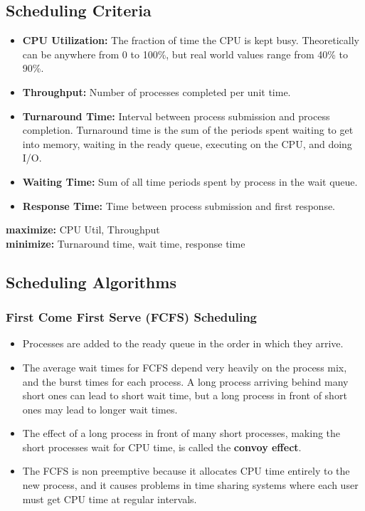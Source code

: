 \documentclass{article}
\theoremstyle{plain}
\theoremstyle{definition}
\begin{document}
\subsection{Scheduling Criteria}
\begin{itemize}
    \item \textbf{CPU Utilization:} The fraction of time the CPU is kept busy. Theoretically can be anywhere from 0 to 100\%, but real world values range from 40\% to 90\%.
    
    \item\textbf{Throughput:} Number of processes completed per unit time. 
    
    \item \textbf{Turnaround Time:} Interval between process submission and process completion. Turnaround time is the sum of the periods spent waiting to get into memory, waiting in the ready queue, executing on the CPU, and doing I/O.
    
    \item \textbf{Waiting Time:} Sum of all time periods spent by process in the wait queue.
    
    \item \textbf{Response Time:} Time between process submission and first response. 
\end{itemize}

\textbf{maximize:} CPU Util, Throughput\\
\textbf{minimize:} Turnaround time, wait time, response time

\subsection{Scheduling Algorithms}

\subsubsection{First Come First Serve (FCFS) Scheduling}
\begin{itemize}
    \item Processes are added to the ready queue in the order in which they arrive. 
    
    \item The average wait times for FCFS depend very heavily on the process mix, and the burst times for each process. A long process arriving behind many short ones can lead to short wait time, but a long process in front of short ones may lead to longer wait times. 
    
    \item The effect of a long process in front of many short processes, making the short processes wait for CPU time, is called the \textbf{convoy effect}.
    
    \item The FCFS is non preemptive because it allocates CPU time entirely to the new process, and it causes problems in time sharing systems where each user must get CPU time at regular intervals.
\end{itemize}
\end{document}
